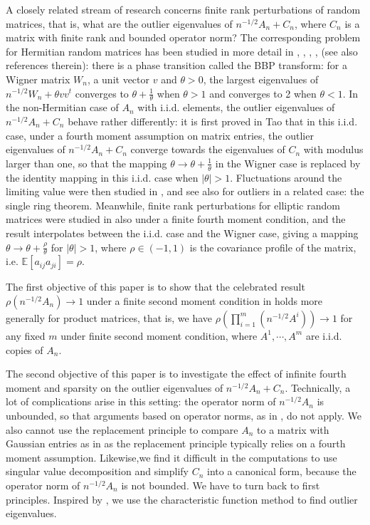 \documentclass[12pt, reqno]{amsart}
\theoremstyle{definition}
\theoremstyle{remark}
\numberwithin{equation}{section}
\begin{document}
A closely related stream of research concerns finite rank perturbations of random matrices, that is, what are the outlier eigenvalues of $n^{-1/2}A_n+C_n$, where $C_n$ is a matrix with finite rank and bounded operator norm? The corresponding problem for Hermitian random matrices has been studied in more detail in \cite{peche2006largest}, \cite{capitaine2012central}, \cite{pizzo2013finite}, \cite{feral2007largest}, \cite{benaych2011eigenvalues} (see also references therein): there is a phase transition called the BBP transform: for a Wigner matrix $W_n$, a unit vector $v$ and $\theta>0$, the largest eigenvalues of $n^{-1/2}W_n+\theta vv^t$ converges to $\theta+\frac{1}{\theta}$ when $\theta>1$ and converges to 2 when $\theta<1$. In the non-Hermitian case of $A_n$ with i.i.d. elements, the outlier eigenvalues of $n^{-1/2}A_n+C_n$ behave rather differently: 
it is first proved in Tao \cite{tao2013outliers} that in this i.i.d. case, under a fourth moment assumption on matrix entries, the outlier eigenvalues of $n^{-1/2}A_n+C_n$ converge towards the eigenvalues of $C_n$ with modulus larger than one, so that the mapping $\theta\to \theta+\frac{1}{\theta}$ in the Wigner case is replaced by the identity mapping in this i.i.d. case when $|\theta|>1$.  Fluctuations around the limiting value were then studied in \cite{bordenave2016outlier}, and see also \cite{benaych2016outliers} for outliers in a related case: the single ring theorem. Meanwhile, finite rank perturbations for elliptic random matrices were studied in \cite{article1221} also under a finite fourth moment condition, and the result interpolates between the i.i.d. case and the Wigner case, giving a mapping $\theta\to \theta+\frac{\rho}{\theta}$ for $|\theta|>1$, where $\rho\in(-1,1)$ is the covariance profile of the matrix, i.e. $\mathbb{E}[a_{ij}a_{ji}]=\rho$.

The first objective of this paper is to show that the celebrated result $\rho(n^{-1/2}A_n)\to 1$ under a finite second moment condition in \cite{bordenave2021convergence} holds more generally for product matrices, that is, we have $\rho(\prod_{i=1}^m(n^{-1/2}A^i))\to 1$ for any fixed $m$ under finite second moment condition, where $A^1,\cdots,A^m$ are i.i.d. copies of $A_n$.

The second objective of this paper is to investigate the effect of infinite fourth moment and sparsity on the outlier eigenvalues of $n^{-1/2}A_n+C_n$. Technically, a lot of complications arise in this setting: the operator norm of $n^{-1/2}A_n$ is unbounded, so that arguments based on operator norms, as in \cite{bordenave2016outlier}, do not apply. We also cannot use the replacement principle to compare $A_n$ to a matrix with Gaussian entries as in \cite{tao2013outliers} as the replacement principle typically relies on a fourth moment assumption. Likewise,we find it difficult in the computations to use singular value decomposition and simplify $C_n$ into a canonical form, because the operator norm of $n^{-1/2}A_n$ is not bounded. We have to turn back to first principles. Inspired by \cite{bordenave2021convergence}, we use the characteristic function method to find outlier eigenvalues. 
\end{document}
